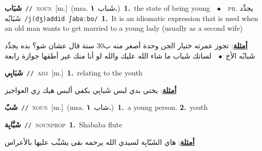 \documentclass[10pt,a4paper,twoside]{article} %
\begin{document}
\begin{multicols}{2}
{{{{{\setlength\topsep{0pt}\textbf{\foreignlanguage{arabic}{شَبَاب}}\ {\color{gray}\texttt{//}\color{black}}\ \textsc{noun}\ [m.]\ \color{gray}(msa. \foreignlanguage{arabic}{شَباب}~\foreignlanguage{arabic}{\textbf{١.}})\color{black}\ \textbf{1.}~the state of being young\ \ $\bullet$\ \ \textsc{ph.} \color{gray} \foreignlanguage{arabic}{يجدِّد شَبَابُه}\color{black}\ {\color{gray}\texttt{/{\sffamily j(dʒ)addid ʃabaːbo}/}\color{black}}\ \textbf{1.}~It is an idiomatic expression that is used when an old man wants to get married to a young lady (usually as a second wife)\  \begin{flushright}\color{gray}\foreignlanguage{arabic}{\textbf{\underline{\foreignlanguage{arabic}{أمثلة}}}: تجوز عمرته ختيار الجن وحدة أصغر منه ب30 سنة قال عشان شو؟ بده يجدِّد شَبابُه الأخ\ $\bullet$\ \  لساتك شَباب ما شاء الله عليك والله لو أنا منك غير أطقها جوازة رابعة}\end{flushright}\color{black}} \vspace{2mm}

{\setlength\topsep{0pt}\textbf{\foreignlanguage{arabic}{شَبَابِي}}\ {\color{gray}\texttt{//}\color{black}}\ \textsc{adj}\ [m.]\ \textbf{1.}~relating to the youth\  \begin{flushright}\color{gray}\foreignlanguage{arabic}{\textbf{\underline{\foreignlanguage{arabic}{أمثلة}}}: يختي بدي لبس شَبابِي بكفي ألبس هيك زي العواجيز}\end{flushright}\color{black}} \vspace{2mm}

{\setlength\topsep{0pt}\textbf{\foreignlanguage{arabic}{شَبّ}}\ {\color{gray}\texttt{//}\color{black}}\ \textsc{noun}\ [m.]\ \color{gray}(msa. \foreignlanguage{arabic}{شاب}~\foreignlanguage{arabic}{\textbf{١.}})\color{black}\ \textbf{1.}~a young person.  \textbf{2.}~youth\ 

{\setlength\topsep{0pt}\textbf{\foreignlanguage{arabic}{شَبَّابِة}}\ {\color{gray}\texttt{//}\color{black}}\ \textsc{noun\textunderscore prop}\ \textbf{1.}~Shababa flute\  \begin{flushright}\color{gray}\foreignlanguage{arabic}{\textbf{\underline{\foreignlanguage{arabic}{أمثلة}}}: هاي الشَبّابِة لسيدي الله يرحمه بقى  يشَبِّب عليها بالأعراس}\end{flushright}\color{black}} \vspace{2mm}

}}}}}
\end{multicols}
\end{document}

